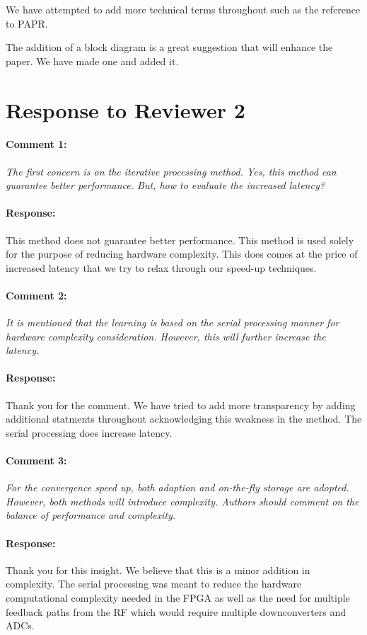 \documentclass[]{article}
\begin{document}
We have attempted to add more technical terms throughout such as the reference to PAPR. 

The addition of a block diagram is a great suggestion that will enhance the paper. We have made one and added it.


\section{Response to Reviewer 2}
\paragraph{Comment 1:}\textit{The first concern is on the iterative processing method. Yes, this method can guarantee better performance. But, how to evaluate the increased latency?}
\paragraph{Response:}
This method does not guarantee better performance. This method is used solely for the purpose of reducing hardware complexity. This does comes at the price of increased latency that we try to relax through our speed-up techniques. 

\paragraph{Comment 2:}\textit{It is mentioned that the learning is based on the serial processing manner for hardware complexity consideration. However, this will further increase the latency.}
\paragraph{Response:}
Thank you for the comment. We have tried to add more transparency by adding additional statments throughout acknowledging this weakness in the method. The serial processing does increase latency.
	
\paragraph{Comment 3:}\textit{For the convergence speed up, both adaption and on-the-fly storage are adopted. However, both methods will introduce complexity. Authors should comment on the balance of performance and complexity.}
\paragraph{Response:}
Thank you for this insight. We believe that this is a minor addition in complexity. The serial processing was meant to reduce the hardware computational complexity needed in the FPGA as well as the need for multiple feedback paths from the RF which would require multiple downconverters and ADCs.
\end{document}
